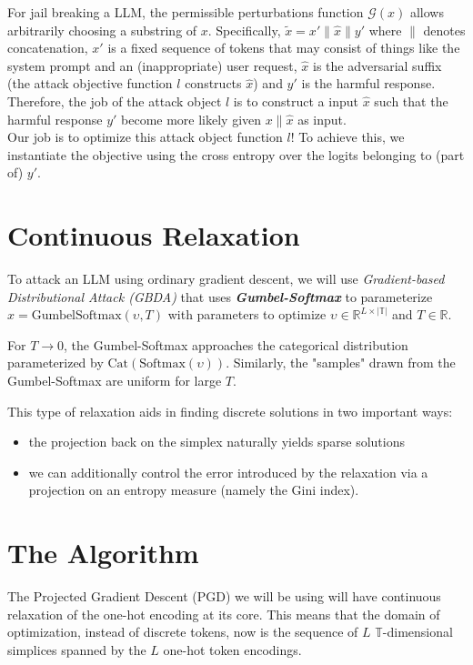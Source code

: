 \documentclass[a4paper, 11pt]{article}
\newcommand{\nt}[2]{\begin{note}{#1}{}#2\end{note}}
\begin{document}
For jail breaking a LLM, the permissible perturbations function $\mathcal{G}(x)$ allows arbitrarily choosing a substring of $x$. Specifically, $\tilde{x} = x' \lVert \hat{x} \rVert y'$ where $\lVert$ denotes concatenation, $x'$ is a fixed sequence of tokens that may consist of things like the system prompt and an (inappropriate) user request, $\hat{x}$ is the adversarial suffix (the attack objective function $l$ constructs $\hat{x}$) and $y'$ is the harmful response. Therefore, the job of the attack object $l$ is to construct a input $\hat{x}$ such that the harmful response $y'$ become more likely given $x \lVert \hat{x}$ as input. \\
Our job is to optimize this attack object function $l$! To achieve this, we instantiate the objective using the cross entropy over the logits belonging to (part of) $y'$.

\section{Continuous Relaxation}
To attack an LLM using ordinary gradient descent, we will use \emph{Gradient-based Distributional Attack (GBDA)} that uses \textbf{\emph{Gumbel-Softmax}} to parameterize $x = \textrm{GumbelSoftmax}(\upsilon, T)$ with parameters to optimize $\upsilon \in \mathbb{R}^{L \times \lvert \mathbb{T} \rvert}$ and $T \in \mathbb{R}$.
\nt{For $T \longrightarrow 0$, the Gumbel-Softmax approaches the categorical distribution parameterized by $\textrm{Cat}(\textrm{Softmax}(\upsilon))$. Similarly, the "samples" drawn from the Gumbel-Softmax are uniform for large $T$.}{}

This type of relaxation aids in finding discrete solutions in two important ways:
\begin{itemize}
  \item the projection back on the simplex naturally yields sparse solutions
  \item we can additionally control the error introduced by the relaxation via a projection on an entropy measure (namely the Gini index).
\end{itemize}

\section{The Algorithm}

The Projected Gradient Descent (PGD) we will be using will have continuous relaxation of the one-hot encoding at its core. This means that the domain of optimization, instead of discrete tokens, now is the sequence of $L$ $\mathbb{T}$-dimensional simplices spanned by the $L$ one-hot token encodings.
\end{document}
